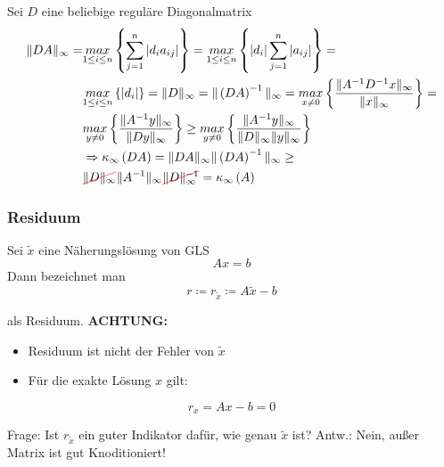 Sei $D$ eine beliebige reguläre Diagonalmatrix
\begin{equation*}
\begin{aligned}
  \|DA\|_\infty = &\underset{1 \leq i \leq n}{max} \left\{\sum\limits_{j=1}^{n}{\left|d_ia_{ij}\right|}\right\} =
  \underset{1 \leq i \leq n}{max}\left\{\left|d_i\right|\sum\limits_{j=1}^{n}{\left|a_{ij}\right|}\right\} = \\
  &\underset{1 \leq i \leq n}{max}\left\{\left|d_i\right|\right\} = \|D\|_\infty = 
  \|\left(DA\right)^{-1}\|_\infty = \underset{x \neq 0}{max}\left\{\frac{\|A^{-1}D^{-1}x\|_\infty}{\|x\|_\infty}\right\} = \\
  &\underset{y \neq 0}{max}\left\{\frac{\|A^{-1}y\|_\infty}{\|Dy\|_\infty}\right\} \geq \underset{y \neq 0}{max}\left\{\frac{\|A^{-1}y\|_\infty}{\|D\|_\infty\|y\|_\infty}   \right\} \\
  &\Rightarrow \kappa_\infty\left(DA\right) = \|DA\|_\infty \|\left(DA\right)^{-1}\|_\infty \geq \\
  &\hcancel{$\|D\|_\infty$} \|A^{-1}\|_\infty \hcancel{$\|D\|_{\infty}^{-1}$} = \kappa_\infty\left(A\right)
\end{aligned}
\end{equation*}

\subsubsection{Residuum}
Sei $\widetilde
{x}$ eine Näherungslösung von GLS
\begin{equation*}
Ax=b
\end{equation*}
Dann bezeichnet man
\begin{equation*}
r \coloneqq r_{\widetilde{x}} \coloneqq A\widetilde{x} - b
\end{equation*}

als Residuum.
\textbf{ACHTUNG:}
\begin{itemize}
  \item{Residuum ist nicht der Fehler von $\widetilde{x}$}
	\item{Für die exakte Lösung $x$ gilt:}
\end{itemize}
\begin{equation*}
r_x = Ax - b = 0
\end{equation*}

Frage: Ist $r_{\widetilde{x}}$ ein guter Indikator dafür, wie genau $\widetilde{x}$ ist?
Antw.: Nein, außer Matrix ist gut Knoditioniert!

